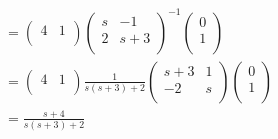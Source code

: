 \documentclass[12pt,a4paper]{article}
\begin{document}
\begin{itemize}
\begin{tcolorbox}[breakable]
\begin{equation*}
\begin{aligned}
&=\begin{pmatrix}
 4 & 1\\
\end{pmatrix}
\begin{pmatrix}
s&-1\\
2&s+3\\
\end{pmatrix}
^{-1}
\begin{pmatrix}
0\\
1\\
\end{pmatrix}\\
&=\begin{pmatrix}
 4 & 1\\
\end{pmatrix}
\frac{1}{s(s+3)+2}
\begin{pmatrix}
s+3&1\\
-2&s\\
\end{pmatrix}
\begin{pmatrix}
0\\
1\\
\end{pmatrix}\\
&= \frac{s+4}{s(s+3)+2}
\end{aligned}
\end{equation*}
\end{tcolorbox}


\end{itemize}
\end{document}
